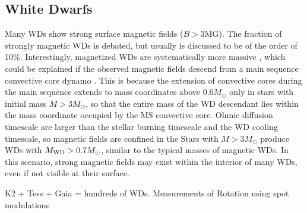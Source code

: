 {\color{red} \subsection{White Dwarfs}}
Many WDs show strong surface magnetic fields ($B>$3MG). The fraction of strongly magnetic WDs is debated, but usually is discussed to be of the order of 10\%. Interestingly, magnetized WDs are systematically more massive \cite{Ferrario_2015}, which could be explained if the observed magnetic fields descend from a main sequence convective core dynamo \cite{Cantiello_2016}. This is because the extension of convective cores during the main sequence extends to mass coordinates above 0.6$M_\odot$ only in stars with initial mass $M>3M_\odot$, so that the entire mass of the WD descendant lies within the mass coordinate occupied by the MS convective core. Ohmic diffusion timescale are larger than the stellar burning timescale and the WD cooling timescale, so magnetic fields are confined in the   Stars with $M>3M_\odot$ produce WDs with $M_{\rm WD}>0.7M_\odot$, similar to the typical masses of magnetic WDs. In this scenario, strong magnetic fields may exist within the interior of many WDs, even if not visible at their surface. 

K2 + Tess + Gaia = hundreds of WDs. Measurements of Rotation using spot modulations
